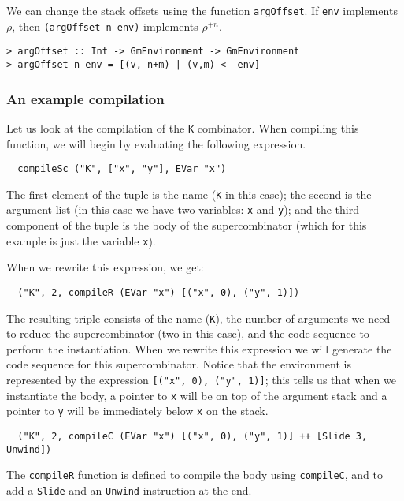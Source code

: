 %
%
%
%
We can change the stack offsets using the function \mbox{\tt argOffset}. 
If \mbox{\tt env} implements
$\rho$, then \mbox{\tt (argOffset\ n\ env)} implements $\rho^{+n}$.
\begin{verbatim}
> argOffset :: Int -> GmEnvironment -> GmEnvironment
> argOffset n env = [(v, n+m) | (v,m) <- env]
\end{verbatim}
%
%
\subsubsection{An example compilation}

Let us look at the compilation of the \mbox{\tt K} combinator. When compiling
this function, we will begin by evaluating the following expression.
\begin{verbatim}
  compileSc ("K", ["x", "y"], EVar "x")
\end{verbatim}
The first element of the tuple is the name (\mbox{\tt K} in this case); the
second is the argument list (in this case we have two variables: \mbox{\tt x}
and \mbox{\tt y}); and the third component of the tuple is the body of the
supercombinator (which for this example is just the variable \mbox{\tt x}).

When we rewrite this expression, we get:
\begin{verbatim}
  ("K", 2, compileR (EVar "x") [("x", 0), ("y", 1)])
\end{verbatim}
The resulting triple consists of the name (\mbox{\tt K}), the number of
arguments we need to reduce the supercombinator (two in this case),
and the code sequence to perform the instantiation. When we rewrite
this expression we will generate the code sequence for this
supercombinator. Notice that the environment is represented by the
expression \mbox{\tt [("x",\ 0),\ ("y",\ 1)]}; this tells us that when we
instantiate the body, a pointer to \mbox{\tt x} will be on top of the argument
stack and a pointer to \mbox{\tt y} will be immediately below \mbox{\tt x} on the stack.
\begin{verbatim}
  ("K", 2, compileC (EVar "x") [("x", 0), ("y", 1)] ++ [Slide 3, Unwind])
\end{verbatim}
The \mbox{\tt compileR} function is defined to compile the body using
\mbox{\tt compileC}, and to add a \mbox{\tt Slide} and an \mbox{\tt Unwind} instruction at the
end.


